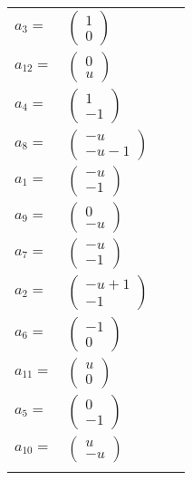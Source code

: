 \documentclass[1p]{elsarticle_modified}
\theoremstyle{definition}
\begin{document}
\begin{tabular}{m{7pt} m{180pt} m{7pt} m{180pt} }
\flushright $a_{3}=$&$\begin{pmatrix}1\\0\end{pmatrix}$ \\
\flushright $a_{12}=$&$\begin{pmatrix}0\\u\end{pmatrix}$ \\
\flushright $a_{4}=$&$\begin{pmatrix}1\\-1\end{pmatrix}$ \\
\flushright $a_{8}=$&$\begin{pmatrix}- u\\- u-1\end{pmatrix}$ \\
\flushright $a_{1}=$&$\begin{pmatrix}- u\\-1\end{pmatrix}$ \\
\flushright $a_{9}=$&$\begin{pmatrix}0\\- u\end{pmatrix}$ \\
\flushright $a_{7}=$&$\begin{pmatrix}- u\\-1\end{pmatrix}$ \\
\flushright $a_{2}=$&$\begin{pmatrix}- u+1\\-1\end{pmatrix}$ \\
\flushright $a_{6}=$&$\begin{pmatrix}-1\\0\end{pmatrix}$ \\
\flushright $a_{11}=$&$\begin{pmatrix}u\\0\end{pmatrix}$ \\
\flushright $a_{5}=$&$\begin{pmatrix}0\\-1\end{pmatrix}$ \\
\flushright $a_{10}=$&$\begin{pmatrix}u\\- u\end{pmatrix}$\\&\end{tabular}
\end{document}

